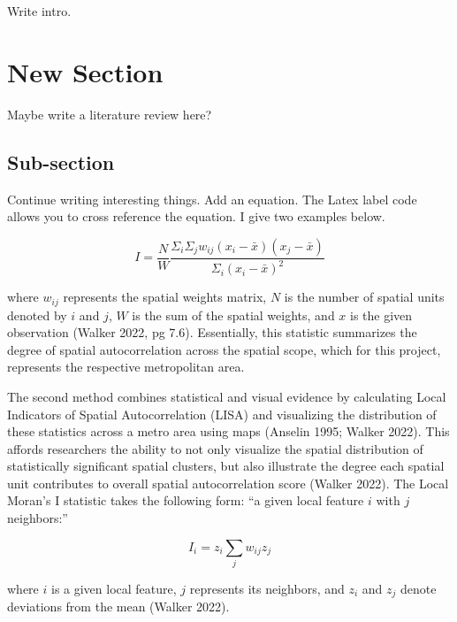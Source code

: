 \documentclass[
]{DissertateCUNY}
\begin{document}
Write intro.

\hypertarget{new-section-1}{%
\section{New Section}\label{new-section-1}}

Maybe write a literature review here?

\hypertarget{sub-section}{%
\subsection{Sub-section}\label{sub-section}}

Continue writing interesting things. Add an equation. The Latex label
code allows you to cross reference the equation. I give two examples
below.

\begin{equation} \label{eq:gmi}
I = \frac{N}{W} \frac{ \Sigma_{i}\Sigma_{j}w_{ij}(x_{i} - \bar{x})(x_{j} - \bar{x}) } { \Sigma_{i}(x_{i} - \bar{x})^2 } 
\end{equation}

where \(w_{ij}\) represents the spatial weights matrix, \(N\) is the
number of spatial units denoted by \(i\) and \(j\), \(W\) is the sum of
the spatial weights, and \(x\) is the given observation (Walker 2022, pg
7.6). Essentially, this statistic summarizes the degree of spatial
autocorrelation across the spatial scope, which for this project,
represents the respective metropolitan area.

The second method combines statistical and visual evidence by
calculating Local Indicators of Spatial Autocorrelation (LISA) and
visualizing the distribution of these statistics across a metro area
using maps (Anselin 1995; Walker 2022). This affords researchers the
ability to not only visualize the spatial distribution of statistically
significant spatial clusters, but also illustrate the degree each
spatial unit contributes to overall spatial autocorrelation score
(Walker 2022). The Local Moran's I statistic takes the following form:
``a given local feature \(i\) with \(j\) neighbors:''

\begin{equation} \label{eq:lmi}
I_{i} = z_{i} \sum_{j} {w_{ij} z_{j}} 
\end{equation}

where \(i\) is a given local feature, \(j\) represents its neighbors,
and \(z_{i}\) and \(z_{j}\) denote deviations from the mean (Walker
2022).
\end{document}
